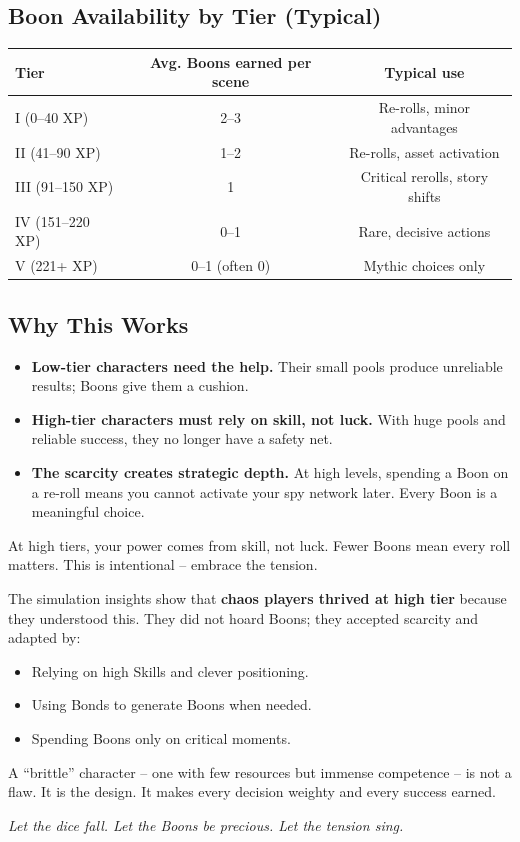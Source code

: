 \subsection*{Boon Availability by Tier (Typical)}

\begin{center}
\begin{tabularx}{\linewidth}{lcc}
\toprule
\textbf{Tier} & \textbf{Avg. Boons earned per scene} & \textbf{Typical use} \\
\midrule
I (0--40 XP) & 2--3 & Re-rolls, minor advantages \\
II (41--90 XP) & 1--2 & Re-rolls, asset activation \\
III (91--150 XP) & 1 & Critical rerolls, story shifts \\
IV (151--220 XP) & 0--1 & Rare, decisive actions \\
V (221+ XP) & 0--1 (often 0) & Mythic choices only \\
\bottomrule
\end{tabularx}
\end{center}

\subsection*{Why This Works}
\begin{itemize}
  \item \textbf{Low-tier characters need the help.} Their small pools produce unreliable results; Boons give them a cushion.
  \item \textbf{High-tier characters must rely on skill, not luck.} With huge pools and reliable success, they no longer have a safety net.
  \item \textbf{The scarcity creates strategic depth.} At high levels, spending a Boon on a re-roll means you cannot activate your spy network later. Every Boon is a meaningful choice.
\end{itemize}

\begin{tcolorbox}[colback=blue!5!white, colframe=blue!75!black, title=Why Brittleness is Good,breakable]
At high tiers, your power comes from skill, not luck. Fewer Boons mean every roll matters. This is intentional -- embrace the tension.

\medskip
\noindent The simulation insights show that \textbf{chaos players thrived at high tier} because they understood this. They did not hoard Boons; they accepted scarcity and adapted by:
\begin{itemize}
  \item Relying on high Skills and clever positioning.
  \item Using Bonds to generate Boons when needed.
  \item Spending Boons only on critical moments.
\end{itemize}
A ``brittle'' character -- one with few resources but immense competence -- is not a flaw. It is the design. It makes every decision weighty and every success earned.

\medskip
\noindent \textit{Let the dice fall. Let the Boons be precious. Let the tension sing.}
\end{tcolorbox}

